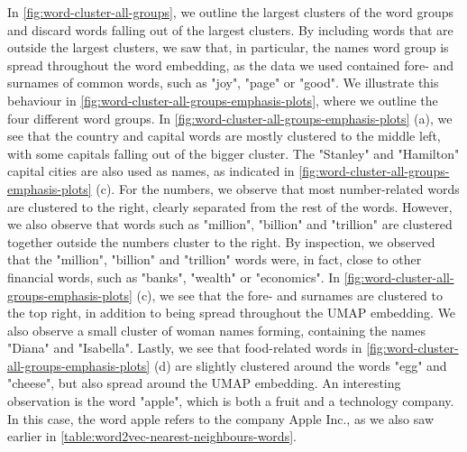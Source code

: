 In \cref{fig:word-cluster-all-groups}, we outline the largest clusters of the word groups and discard words falling out of the largest clusters. By including words that are outside the largest clusters, we saw that, in particular, the names word group is spread throughout the word embedding, as the data we used contained fore- and surnames of common words, such as "joy", "page" or "good". We illustrate this behaviour in \cref{fig:word-cluster-all-groups-emphasis-plots}, where we outline the four different word groups. In \cref{fig:word-cluster-all-groups-emphasis-plots} (a), we see that the country and capital words are mostly clustered to the middle left, with some capitals falling out of the bigger cluster. The "Stanley" and "Hamilton" capital cities are also used as names, as indicated in \cref{fig:word-cluster-all-groups-emphasis-plots} (c). For the numbers, we observe that most number-related words are clustered to the right, clearly separated from the rest of the words. However, we also observe that words such as "million", "billion" and "trillion" are clustered together outside the numbers cluster to the right. By inspection, we observed that the "million", "billion" and "trillion" words were, in fact, close to other financial words, such as "banks", "wealth" or "economics". In \cref{fig:word-cluster-all-groups-emphasis-plots} (c), we see that the fore- and surnames are clustered to the top right, in addition to being spread throughout the UMAP embedding. We also observe a small cluster of woman names forming, containing the names "Diana" and "Isabella". Lastly, we see that food-related words in \cref{fig:word-cluster-all-groups-emphasis-plots} (d) are slightly clustered around the words "egg" and "cheese", but also spread around the UMAP embedding. An interesting observation is the word "apple", which is both a fruit and a technology company. In this case, the word apple refers to the company Apple Inc., as we also saw earlier in \cref{table:word2vec-nearest-neighbours-words}.
